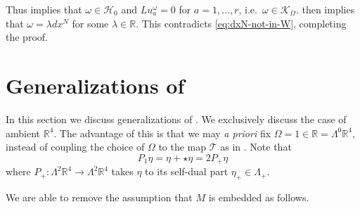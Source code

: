 \documentclass[11pt]{amsart}
\numberwithin{equation}{section}
\theoremstyle{plain}
\theoremstyle{definition}
\theoremstyle{remark}
\newcommand{\R}{\mathbb{R}}
\newcommand{\Hcal}{\mathcal H}
\newcommand{\Kcal}{\mathcal K}
\newcommand{\Tcal}{\mathcal T}
\begin{document}
Thus  implies that $\omega \in \Hcal_0$ and $Lu^\omega_a = 0$ for $a=1,\dots,r$, i.e.\ $\omega \in \Kcal_\Omega$.  then implies that $\omega = \lambda dx^N$ for some $\lambda \in \R$. This contradicts \eqref{eq:dxN-not-in-W}, completing the proof. 

\section{Generalizations of } \label{sec:gen}

In this section we discuss generalizations of . We exclusively discuss the case of ambient $\R^4$. The advantage of this is that we may \emph{a priori} fix $\Omega = 1 \in \R = \Lambda^0\R^4$, instead of coupling the choice of $\Omega$ to the map $\Tcal$ as in . Note that
\[
P_1\eta = \eta + \star \eta = 2 P_+ \eta
\]
where $P_+ : \Lambda^2\R^4\to\Lambda^2\R^4$ takes $\eta$ to its self-dual part $\eta_+ \in \Lambda_+$. 

We are able to remove the assumption that $M$ is embedded as follows.
\end{document}
